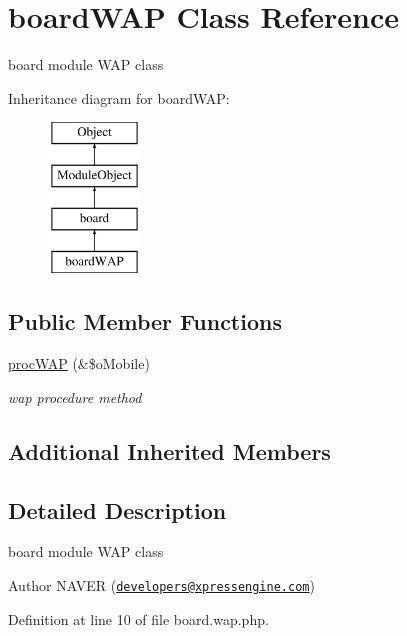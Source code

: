 \hypertarget{classboardWAP}{\section{board\-W\-A\-P Class Reference}
\label{classboardWAP}
}


board module W\-A\-P class  


Inheritance diagram for board\-W\-A\-P\-:\begin{figure}[H]
\begin{center}
\leavevmode
\includegraphics[height=4.000000cm]{classboardWAP}
\end{center}
\end{figure}
\subsection*{Public Member Functions}
\begin{DoxyCompactItemize}
\item 
\hyperlink{classboardWAP_a64fd2fe05d7bb01d701f07e763f54a4b}{proc\-W\-A\-P} (\&\$o\-Mobile)
\begin{DoxyCompactList}\small\item\em wap procedure method \end{DoxyCompactList}\end{DoxyCompactItemize}
\subsection*{Additional Inherited Members}


\subsection{Detailed Description}
board module W\-A\-P class 

\begin{DoxyAuthor}{Author}
N\-A\-V\-E\-R (\href{mailto:developers@xpressengine.com}{\tt developers@xpressengine.\-com}) 
\end{DoxyAuthor}


Definition at line 10 of file board.\-wap.\-php.



